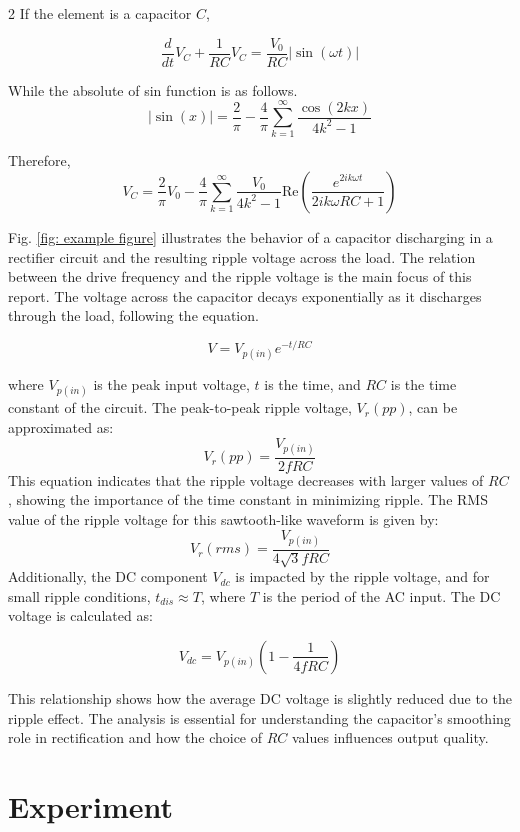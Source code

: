 \documentclass{article}
\begin{document}
\begin{multicols}{2}
If the element is a capacitor $C$,

\begin{equation}
    \frac{d}{dt}V_C + \frac{1}{RC}V_C = \frac{V_0}{RC}\left|\sin(\omega t)\right|
\end{equation}

While the absolute of sin function is as follows.
\[
    \left| \sin(x) \right|=\frac{2}{\pi} - \frac{4}{\pi} \sum_{k=1}^{\infty} \frac{\cos(2kx)}{4k^2-1} 
\]

Therefore,
\begin{equation}
    V_C = \frac{2}{\pi}V_0 - \frac{4}{\pi} \sum_{k=1}^{\infty} \frac{V_0}{4k^2-1} \mathrm{Re}(\frac {e^{2ik\omega t}}{2ik\omega RC+1})
\end{equation}


Fig. \ref{fig: example figure} illustrates the behavior of a capacitor discharging in a rectifier circuit and the resulting ripple voltage across the load.
The relation between the drive frequency and the ripple voltage is the main focus of this report.
The voltage across the capacitor decays exponentially as it discharges through the load, following the equation.

\[
V = V_{p(in)} e^{-t/RC}
\]

where \( V_{p(in)} \) is the peak input voltage, \( t \) is the time, and \( RC \) is the time constant of the circuit. The peak-to-peak ripple voltage, \( V_r(pp) \), can be approximated as:
\[
V_r(pp) = \frac{V_{p(in)}}{2f RC}
\]
This equation indicates that the ripple voltage decreases with larger values of \( RC \), showing the importance of the time constant in minimizing ripple.
The RMS value of the ripple voltage for this sawtooth-like waveform is given by:
\[
V_r(rms) = \frac{V_{p(in)}}{4\sqrt{3}f RC}
\]
Additionally, the DC component \( V_{dc} \) is impacted by the ripple voltage, and for small ripple conditions, \( t_{dis} \approx T \), where \( T \) is the period of the AC input. The DC voltage is calculated as:

\[
V_{dc} = V_{p(in)} \left( 1 - \frac{1}{4f RC} \right)
\]

This relationship shows how the average DC voltage is slightly reduced due to the ripple effect. The analysis is essential for understanding the capacitor's smoothing role in rectification and how the choice of \( RC \) values influences output quality.


\section{Experiment}

\end{multicols}
\end{document}
